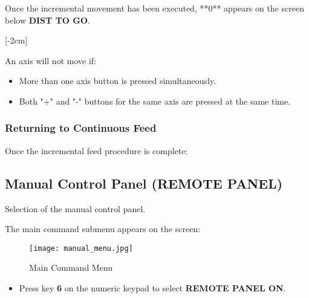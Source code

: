 Once the incremental movement has been executed, **0** appears on the screen below \textbf{DIST TO GO}.

[-2cm]

An axis will not move if:
\begin{itemize}
    \item More than one axis button is pressed simultaneously.
    \item Both "+" and "-" buttons for the same axis are pressed at the same time.
\end{itemize}

\subsubsection*{Returning to Continuous Feed}

Once the incremental feed procedure is complete:

\begin{itemize}
\end{itemize}

\newpage

\subsection{Manual Control Panel (REMOTE PANEL)}

Selection of the manual control panel.

\procedure

\begin{itemize}
\end{itemize}

\vspace{.5cm}
\begin{itemize}
\end{itemize}
\vspace{.5cm}
The main command submenu appears on the screen:

\begin{figure}[h]
    \centering
    \texttt{[image: manual\_menu.jpg]}
    \caption{Main Command Menu}
\end{figure}

\begin{itemize}
    \item Press key \textbf{6} on the numeric keypad to select \textbf{REMOTE PANEL ON}.
\end{itemize}

